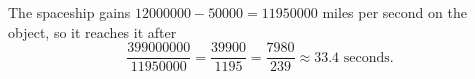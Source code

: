 The spaceship gains $12000000-50000=11950000$ miles per second on the object, so it reaches it after
\[\dfrac{399000000}{11950000}=\dfrac{39900}{1195}=\boxed{\dfrac{7980}{239}}\approx33.4\text{ seconds}.\]
